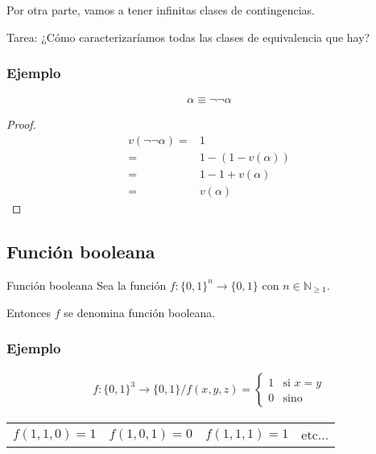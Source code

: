 Por otra parte, vamos a tener infinitas clases de contingencias.

Tarea: ¿Cómo caracterizaríamos todas las clases de equivalencia que hay?


\subsubsection{Ejemplo}

%
\begin{gather*}
    \alpha \equiv \neg\neg \alpha
\end{gather*}

\begin{proof} \phantom{.}

    \begin{align*}
        v(\neg \neg \alpha) =& 1 \\
        =& 1-(1-v(\alpha)) \\
        =& 1 - 1 + v(\alpha) \\
        =& v(\alpha)
    \end{align*}
\end{proof}

\subsection{Función booleana}

\begin{definicion}{Función booleana}{}    
    Sea la función $f: {\{ 0,1 \}}^{n} \to \{ 0,1 \}$ con 
    $n \in \mathbb{N}_{\geq 1}$.

    Entonces $f$ se denomina función booleana.
\end{definicion}

\subsubsection{Ejemplo}

\begin{gather*}
    f: {\{ 0,1 \}}^{3} \to \{ 0,1 \} / f(x,y,z) = \begin{cases}
        1 & \text{si } x = y\\
        0 & \text{sino} 
    \end{cases}
\end{gather*}

\begin{center}
    \begin{tabular}{c c c c} 
        $f(1,1,0)=1$ & $f(1,0,1)=0$ & $f(1,1,1)=1$ & etc...
    \end{tabular}
\end{center}

